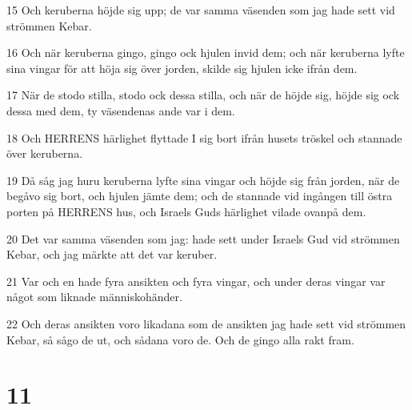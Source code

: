 \par 15 Och keruberna höjde sig upp; de var samma väsenden som jag hade sett vid strömmen Kebar.
\par 16 Och när keruberna gingo, gingo ock hjulen invid dem; och när keruberna lyfte sina vingar för att höja sig över jorden, skilde sig hjulen icke ifrån dem.
\par 17 När de stodo stilla, stodo ock dessa stilla, och när de höjde sig, höjde sig ock dessa med dem, ty väsendenas ande var i dem.
\par 18 Och HERRENS härlighet flyttade I sig bort ifrån husets tröskel och stannade över keruberna.
\par 19 Då såg jag huru keruberna lyfte sina vingar och höjde sig från jorden, när de begåvo sig bort, och hjulen jämte dem; och de stannade vid ingången till östra porten på HERRENS hus, och Israels Guds härlighet vilade ovanpå dem.
\par 20 Det var samma väsenden som jag: hade sett under Israels Gud vid strömmen Kebar, och jag märkte att det var keruber.
\par 21 Var och en hade fyra ansikten och fyra vingar, och under deras vingar var något som liknade människohänder.
\par 22 Och deras ansikten voro likadana som de ansikten jag hade sett vid strömmen Kebar, så sågo de ut, och sådana voro de. Och de gingo alla rakt fram.

\chapter{11}

